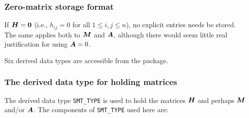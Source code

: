 \documentclass{galahad}
\begin{document}
\subsubsection{Zero-matrix storage format}\label{zero}
If ${\bm{H}} = {\bm{0}}$ (i.e., $h_{ij} = 0$ for all $1 \leq i, j \leq n$),
no explicit entries needs be stored. The same applies both to ${\bm{M}}$ and ${\bm{A}}$,
although there would seem little real justification for using ${\bm{A}} = 0$.








\galtypes
Six derived data types are accessible from the package.


\subsubsection{The derived data type for holding matrices}\label{typesmt}
The derived data type {\tt SMT\_TYPE} is used to hold the matrices ${\bm{H}}$
and perhaps ${\bm{M}}$ and/or ${\bm{A}}$.
The components of {\tt SMT\_TYPE} used here are:
\end{document}
